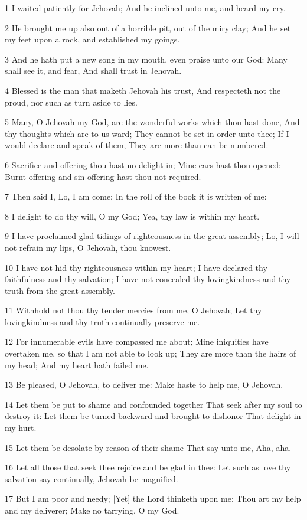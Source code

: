 \par 1 I waited patiently for Jehovah; And he inclined unto me, and heard my cry.
\par 2 He brought me up also out of a horrible pit, out of the miry clay; And he set my feet upon a rock, and established my goings.
\par 3 And he hath put a new song in my mouth, even praise unto our God: Many shall see it, and fear, And shall trust in Jehovah.
\par 4 Blessed is the man that maketh Jehovah his trust, And respecteth not the proud, nor such as turn aside to lies.
\par 5 Many, O Jehovah my God, are the wonderful works which thou hast done, And thy thoughts which are to us-ward; They cannot be set in order unto thee; If I would declare and speak of them, They are more than can be numbered.
\par 6 Sacrifice and offering thou hast no delight in; Mine ears hast thou opened: Burnt-offering and sin-offering hast thou not required.
\par 7 Then said I, Lo, I am come; In the roll of the book it is written of me:
\par 8 I delight to do thy will, O my God; Yea, thy law is within my heart.
\par 9 I have proclaimed glad tidings of righteousness in the great assembly; Lo, I will not refrain my lips, O Jehovah, thou knowest.
\par 10 I have not hid thy righteousness within my heart; I have declared thy faithfulness and thy salvation; I have not concealed thy lovingkindness and thy truth from the great assembly.
\par 11 Withhold not thou thy tender mercies from me, O Jehovah; Let thy lovingkindness and thy truth continually preserve me.
\par 12 For innumerable evils have compassed me about; Mine iniquities have overtaken me, so that I am not able to look up; They are more than the hairs of my head; And my heart hath failed me.
\par 13 Be pleased, O Jehovah, to deliver me: Make haste to help me, O Jehovah.
\par 14 Let them be put to shame and confounded together That seek after my soul to destroy it: Let them be turned backward and brought to dishonor That delight in my hurt.
\par 15 Let them be desolate by reason of their shame That say unto me, Aha, aha.
\par 16 Let all those that seek thee rejoice and be glad in thee: Let such as love thy salvation say continually, Jehovah be magnified.
\par 17 But I am poor and needy; [Yet] the Lord thinketh upon me: Thou art my help and my deliverer; Make no tarrying, O my God.

